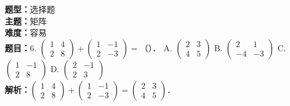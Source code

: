 \documentclass{ctexart}
\newenvironment{question}[5]{%
	\noindent\textbf{题型：}#1\\
	\textbf{主题：}#2\\
	\textbf{难度：}#3\\
	\textbf{题目：}#4\\
	\textbf{解析：}#5\\
	\vspace{1em}
}{}
\begin{document}
	\begin{question}
		{选择题}
		{矩阵}
		{容易}
		{6. \(\left(\begin{array}{ll}1 & 4 \\ 2 & 8\end{array}\right)+\left(\begin{array}{ll}1 & -1 \\ 2 & -3\end{array}\right)=\)（）．
			A. \(\left(\begin{array}{ll}2 & 3 \\ 4 & 5\end{array}\right)\)
			B. \(\left(\begin{array}{cc}2 & 1 \\ -4 & -3\end{array}\right)\)
			C. \(\left(\begin{array}{cc}1 & -1 \\ 2 & 8\end{array}\right)\)
			D. \(\left(\begin{array}{cc}2 & -1 \\ 2 & 3\end{array}\right)\)}
		{\(\left(\begin{array}{ll}1 & 4 \\ 2 & 8\end{array}\right)+\left(\begin{array}{ll}1 & -1 \\ 2 & -3\end{array}\right)=\left(\begin{array}{ll}2 & 3 \\ 4 & 5\end{array}\right)\)．}
	\end{question}
	
\end{document}
